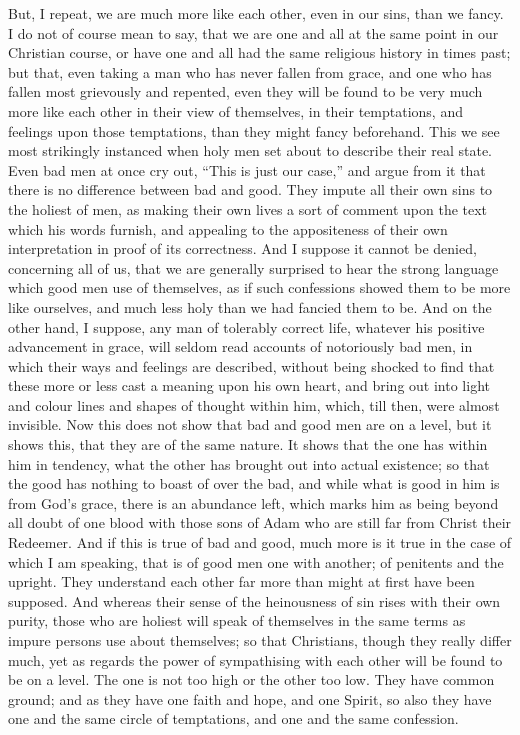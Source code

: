 But, I repeat, we are much more like each other, even in our sins,
than we fancy. I do not of course mean to say, that we are one and all
at the same point in our Christian course, or have one and all had the
same religious history in times past; but that, even taking a man who
has never fallen from grace, and one who has fallen most grievously
and repented, even they will be found to be very much more like each
other in their view of themselves, in their temptations, and feelings
upon those temptations, than they might fancy beforehand. This we see
most strikingly instanced when holy men set about to describe their
real state. Even bad men at once cry out, ``This is just our
case,'' and argue from it that there is no difference between bad
and good. They impute all their own sins to the holiest of men, as
making their own lives a sort of comment upon the text which his words
furnish, and appealing to the appositeness of their own interpretation
in proof of its correctness. And I suppose it cannot be denied,
concerning all of us, that we are generally surprised to hear the
strong language which good men use of themselves, as if such
confessions showed them to be more like ourselves, and much less holy
than we had fancied them to be. And on the other hand, I suppose, any
man of tolerably correct life, whatever his positive advancement in
grace, will seldom read accounts of notoriously bad men, in which
their ways and feelings are described, without being shocked to find
that these more or less cast a meaning upon his own heart, and bring
out into light and colour lines and shapes of thought within him,
which, till then, were almost invisible. Now this does not show that
bad and good men are on a level, but it shows this, that they are of
the same nature. It shows that the one has within him in tendency,
what the other has brought out into actual existence; so that the good
has nothing to boast of over the bad, and while what is good in him is
from God's grace, there is an abundance left, which marks him as being
beyond all doubt of one blood with those sons of Adam who are still
far from Christ their Redeemer. And if this is true of bad and good,
much more is it true in the case of which I am speaking, that is of
good men one with another; of penitents and the upright. They
understand each other far more than might at first have been supposed.
And whereas their sense of the heinousness of sin rises with their own
purity, those who are holiest will speak of themselves in the same
terms as impure persons use about themselves; so that Christians,
though they really differ much, yet as regards the power of
sympathising with each other will be found to be on a level. The one
is not too high or the other too low. They have common ground; and as
they have one faith and hope, and one Spirit, so also they have one
and the same circle of temptations, and one and the same confession.

